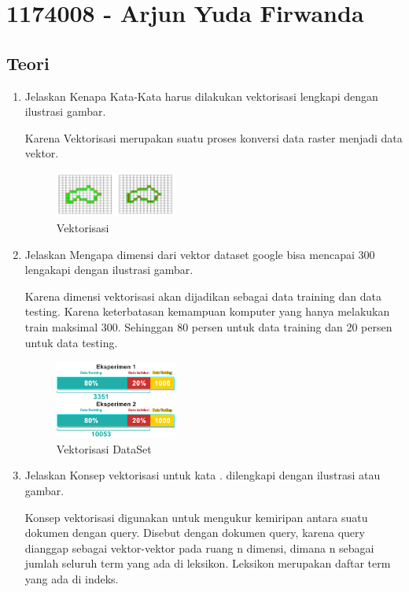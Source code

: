 \section{1174008 - Arjun Yuda Firwanda}

\subsection{Teori}
\begin{enumerate}

\item Jelaskan Kenapa Kata-Kata harus dilakukan vektorisasi lengkapi dengan ilustrasi gambar.\par
Karena Vektorisasi merupakan suatu proses konversi data raster menjadi data vektor.

	\begin{figure}[H]
            	\includegraphics[width=4cm]{figures/1174008/5/vektorisasi.PNG}
           	 \centering
           	 \caption{Vektorisasi}
        	\end{figure}

\item Jelaskan Mengapa dimensi dari vektor dataset google bisa mencapai 300 lengakapi dengan ilustrasi gambar. \par
Karena dimensi vektorisasi akan dijadikan sebagai data training dan data testing. Karena keterbatasan kemampuan komputer yang hanya melakukan train maksimal 300. Sehinggan 80 persen untuk data training dan 20 persen untuk data testing.

	\begin{figure}[H]
		\includegraphics[width=4cm]{figures/1174008/5/vektordataset.PNG}
            	\centering
           	 \caption{Vektorisasi DataSet}
       	 \end{figure}

\item Jelaskan Konsep vektorisasi untuk kata . dilengkapi dengan ilustrasi atau gambar. \par
Konsep vektorisasi digunakan untuk mengukur kemiripan antara suatu dokumen dengan query. Disebut dengan dokumen query, karena query dianggap sebagai vektor-vektor pada ruang n dimensi, dimana n sebagai jumlah seluruh term yang ada di leksikon. Leksikon merupakan daftar term yang ada di indeks.


\end{enumerate}
